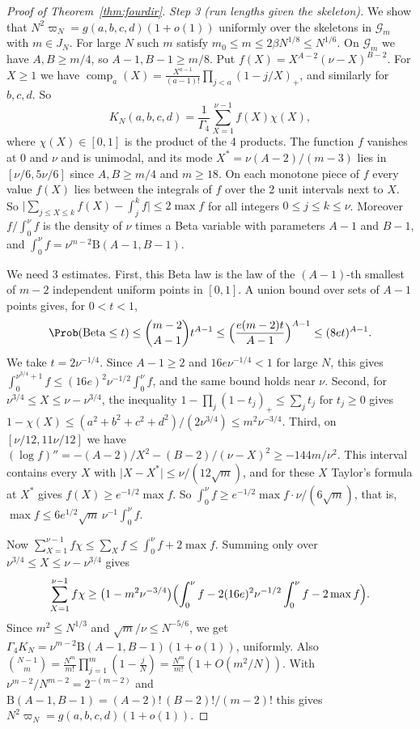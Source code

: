 \begin{proof}[Proof of Theorem~\ref{thm:fourdir}]
\emph{Step 3 (run lengths given the skeleton).} We show that $N^2\varpi_N=g(a,b,c,d)(1+o(1))$
uniformly over the skeletons in $\mathcal G_m$ with $m\in J_N$. For large $N$ such $m$ satisfy
$m_0\le m\le2\beta N^{1/8}\le N^{1/6}$. On $\mathcal G_m$ we have $A,B\ge m/4$, so
$A-1,B-1\ge m/8$. Put $f(X)=X^{A-2}(\nu-X)^{B-2}$. For
$X\ge1$ we have $\operatorname{comp}_a(X)=\frac{X^{a-1}}{(a-1)!}\prod_{j<a}(1-j/X)_+$, and
similarly for $b,c,d$. So
\[
 K_N(a,b,c,d)=\frac1{\Gamma_4}\sum_{X=1}^{\nu-1}f(X)\chi(X),
\]
where $\chi(X)\in[0,1]$ is the product of the 4 products. The function $f$ vanishes at $0$ and
$\nu$ and is unimodal, and its mode $X^*=\nu(A-2)/(m-3)$ lies in $[\nu/6,5\nu/6]$ since
$A,B\ge m/4$ and $m\ge18$. On each monotone piece of $f$ every value $f(X)$ lies between the integrals of $f$ over the 2 unit
intervals next to $X$. So $\lvert\sum_{j\le X\le k}f(X)-\int_j^kf\rvert\le2\max f$ for all integers
$0\le j\le k\le\nu$. Moreover $f/\int_0^\nu f$ is the density of $\nu$ times a Beta variable with
parameters $A-1$ and $B-1$, and $\int_0^\nu f=\nu^{m-2}\mathrm B(A-1,B-1)$.

We need 3 estimates. First, this Beta law is the law of the $(A-1)$-th smallest of $m-2$
independent uniform points in $[0,1]$. A union bound over sets of $A-1$ points gives, for $0<t<1$,
\[
 \Prob(\mathrm{Beta}\le t)\le\binom{m-2}{A-1}t^{A-1}\le\Bigl(\frac{e(m-2)t}{A-1}\Bigr)^{A-1}
 \le(8et)^{A-1}.
\]
We take $t=2\nu^{-1/4}$. Since $A-1\ge2$ and $16e\nu^{-1/4}<1$ for large $N$, this gives
$\int_0^{\nu^{3/4}+1}f\le(16e)^2\nu^{-1/2}\int_0^\nu f$, and the same bound holds near $\nu$. Second,
for $\nu^{3/4}\le X\le\nu-\nu^{3/4}$, the inequality $1-\prod_j(1-t_j)_+\le\sum_jt_j$ for $t_j\ge0$
gives $1-\chi(X)\le(a^2+b^2+c^2+d^2)/(2\nu^{3/4})\le m^2\nu^{-3/4}$. Third, on
$[\nu/12,11\nu/12]$ we have
$(\log f)''=-(A-2)/X^2-(B-2)/(\nu-X)^2\ge-144m/\nu^2$. This interval contains every $X$ with
$\lvert X-X^*\rvert\le\nu/(12\sqrt m)$, and for these $X$ Taylor's formula at $X^*$ gives
$f(X)\ge e^{-1/2}\max f$. So $\int_0^\nu f\ge e^{-1/2}\max f\cdot\nu/(6\sqrt m)$, that is,
$\max f\le6e^{1/2}\sqrt m\,\nu^{-1}\int_0^\nu f$.

Now $\sum_{X=1}^{\nu-1}f\chi\le\sum_Xf\le\int_0^\nu f+2\max f$. Summing only over
$\nu^{3/4}\le X\le\nu-\nu^{3/4}$ gives
\[
 \sum_{X=1}^{\nu-1}f\chi\ge\bigl(1-m^2\nu^{-3/4}\bigr)
 \Bigl(\int_0^\nu f-2(16e)^2\nu^{-1/2}\int_0^\nu f-2\max f\Bigr).
\]
Since $m^2\le N^{1/3}$ and $\sqrt m/\nu\le N^{-5/6}$, we get
$\Gamma_4K_N=\nu^{m-2}\mathrm B(A-1,B-1)(1+o(1))$, uniformly. Also
$\binom{N-1}m=\frac{N^m}{m!}\prod_{j=1}^m(1-\frac jN)=\frac{N^m}{m!}(1+O(m^2/N))$. With
$\nu^{m-2}/N^{m-2}=2^{-(m-2)}$ and $\mathrm B(A-1,B-1)=(A-2)!\,(B-2)!/(m-2)!$ this gives
$N^2\varpi_N=g(a,b,c,d)(1+o(1))$.


\end{proof}
